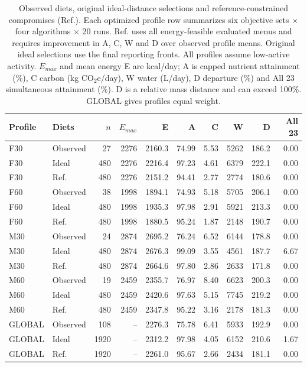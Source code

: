 \begin{table}[pos=h]
\centering\small
\setlength{\tabcolsep}{3pt}
\caption{Observed diets, original ideal-distance selections and reference-constrained compromises (Ref.). Each optimized profile row summarizes six objective sets $\times$ four algorithms $\times$ 20 runs. Ref. uses all energy-feasible evaluated menus and requires improvement in A, C, W and D over observed profile means. Original ideal selections use the final reporting fronts. All profiles assume low-active activity. $E_{max}$ and mean energy E are kcal/day; A is capped nutrient attainment (\%), C carbon (kg CO$_2$e/day), W water (L/day), D departure (\%) and All 23 simultaneous attainment (\%). D is a relative mass distance and can exceed 100\%. GLOBAL gives profiles equal weight.}
\label{tab:observed-comparison}
\begin{tabularx}{\textwidth}{lXrrrrrrrr}
\toprule
Profile & Diets & $n$ & $E_{max}$ & E & A & C & W & D & All 23 \\
\midrule
F30 & Observed & 27 & 2276 & 2160.3 & 74.99 & 5.53 & 5262 & 186.2 & 0.00 \\
F30 & Ideal & 480 & 2276 & 2216.4 & 97.23 & 4.61 & 6379 & 222.1 & 0.00 \\
F30 & Ref. & 480 & 2276 & 2151.2 & 94.41 & 2.77 & 2774 & 180.6 & 0.00 \\
\midrule
F60 & Observed & 38 & 1998 & 1894.1 & 74.93 & 5.18 & 5705 & 206.1 & 0.00 \\
F60 & Ideal & 480 & 1998 & 1935.3 & 97.98 & 2.91 & 5921 & 213.3 & 0.00 \\
F60 & Ref. & 480 & 1998 & 1880.5 & 95.24 & 1.87 & 2148 & 190.7 & 0.00 \\
\midrule
M30 & Observed & 24 & 2874 & 2695.2 & 76.24 & 6.52 & 6144 & 178.8 & 0.00 \\
M30 & Ideal & 480 & 2874 & 2676.3 & 99.09 & 3.55 & 4561 & 187.7 & 6.67 \\
M30 & Ref. & 480 & 2874 & 2664.6 & 97.80 & 2.86 & 2633 & 171.8 & 0.00 \\
\midrule
M60 & Observed & 19 & 2459 & 2355.7 & 76.97 & 8.40 & 6623 & 200.3 & 0.00 \\
M60 & Ideal & 480 & 2459 & 2420.6 & 97.63 & 5.15 & 7745 & 219.2 & 0.00 \\
M60 & Ref. & 480 & 2459 & 2347.8 & 95.22 & 3.16 & 2178 & 181.3 & 0.00 \\
\midrule
GLOBAL & Observed & 108 & -- & 2276.3 & 75.78 & 6.41 & 5933 & 192.9 & 0.00 \\
GLOBAL & Ideal & 1920 & -- & 2312.2 & 97.98 & 4.05 & 6152 & 210.6 & 1.67 \\
GLOBAL & Ref. & 1920 & -- & 2261.0 & 95.67 & 2.66 & 2434 & 181.1 & 0.00 \\
\bottomrule
\end{tabularx}
\end{table}
